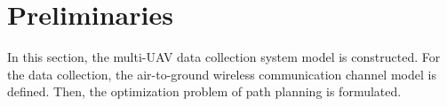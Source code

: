 \documentclass[journal]{IEEEtran}
\begin{document}
%

\section{Preliminaries}\label{preliminaries}
In this section, the multi-UAV data collection system model is constructed. For the data collection, the air-to-ground wireless communication channel model is defined. Then, the optimization problem of path planning is formulated. 
\end{document}
